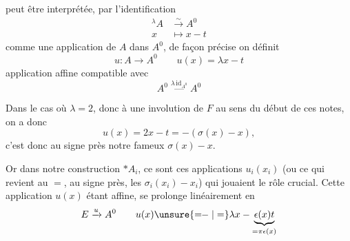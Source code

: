 peut être interprétée, par l'identification
\[
\begin{aligned}
{}^\lambda A&\xrightarrow{\sim}A^0\\
x&\mapsto x-t
\end{aligned}
\]
comme une application de $A$ dans $A^0$,
de façon précise on définit
\[
u:A\longrightarrow A^0\qquad u(x)=\lambda x-t
\]
application affine compatible avec
\[
A^0\mathrel{\mathop{\text{---}}\limits^{\lambda\,\mathrm{id}_{A^0}}}A^0
\]

Dans le cas où $\lambda=2$, donc 
à une involution de $F$ au sens
du début de ces notes, on a donc
\[
u(x)=2x-t=-(\sigma(x)-x),
\]
c'est donc au signe près notre fameux
$\sigma(x)-x$.

Or dans notre construction 
$*A_i$, ce sont ces applications $u_i(x_i)$
(ou ce qui revient au $=$, au signe
près, les $\sigma_i(x_i)-x_i$) qui jouaient le
rôle crucial. 
Cette application $u(x)$ étant affine,
se prolonge linéairement en
\[
E\xrightarrow{u}A^0\qquad
u(x)\unsure{\mathrel{=\!\!-}|=}\lambda x-\underbrace{\epsilon(x)t}_{=\pi\epsilon(x)}
\]
